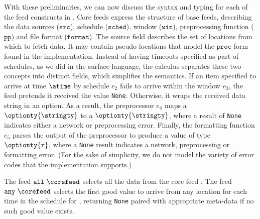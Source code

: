 With these preliminaries, we can now discuss the syntax and typing for
each of the feed constructs in . 
Core feeds express the structure of base feeds, describing
the data sources ($\mathtt{src}$), schedule ($\mathtt{sched}$), window
($\mathtt{win}$), preprocessing function ($\mathtt{pp}$) and file
format ($\mathtt{format}$).  The source field describes the set of
locations from which to fetch data.  It may contain
pseudo-locations that model the $\mathtt{proc}$ form found in the
implementation.  Instead of having timeouts specified as part of
schedules, as we did in the surface language, the calculus separates
these two concepts into distinct fields, which simplifies the semantics.
If an item specified to arrive at time $\atime$ by schedule $e_2$ fails
to arrive within the window $e_3$, the feed pretends it received the
value \texttt{None}.  Otherwise, it wraps the received data string in
an option. As a result, the preprocessor $e_4$ maps a $\optionty{\stringty}$
to a $\optionty{\stringty}$, where a result of \texttt{None} indicates
either a network or preprocessing error.  Finally, the formatting
function $e_5$ parses the output of the preprocessor to produce a 
value of type $\optionty{\tau}$, where a \texttt{None} result
indicates a network, preprocessing or formatting error. (For the sake
of simplicity, we do not model the variety of error codes that the
implementation supports.)  

The feed $\mathtt{all}\ \corefeed$ selects all the data from the core
feed \corefeed.  The feed $\mathtt{any}\ \corefeed$ selects the first
good value to arrive from any location for each time in the schedule
for \corefeed{}, returning \texttt{None} paired with appropriate
meta-data if no such good value exists.    

